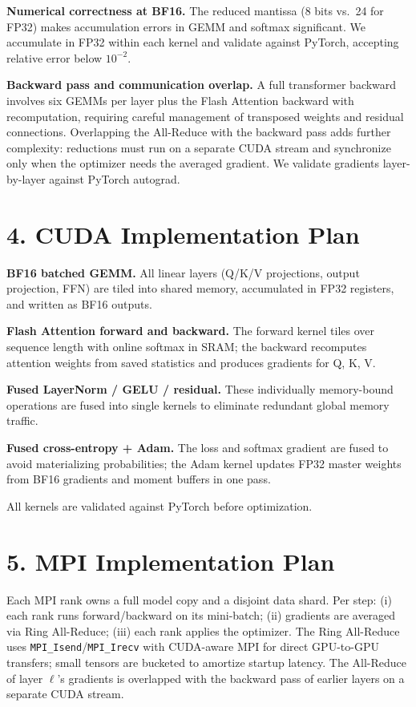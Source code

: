 \documentclass[11pt]{article}
\begin{document}
\textbf{Numerical correctness at BF16.} The reduced mantissa (8 bits vs.\ 24 for FP32) makes accumulation errors in GEMM and softmax significant. We accumulate in FP32 within each kernel and validate against PyTorch, accepting relative error below $10^{-2}$.

\textbf{Backward pass and communication overlap.} A full transformer backward involves six GEMMs per layer plus the Flash Attention backward with recomputation, requiring careful management of transposed weights and residual connections. Overlapping the All-Reduce with the backward pass adds further complexity: reductions must run on a separate CUDA stream and synchronize only when the optimizer needs the averaged gradient. We validate gradients layer-by-layer against PyTorch autograd.

\section*{4. CUDA Implementation Plan}

\textbf{BF16 batched GEMM.} All linear layers (Q/K/V projections, output projection, FFN) are tiled into shared memory, accumulated in FP32 registers, and written as BF16 outputs.

\textbf{Flash Attention forward and backward.} The forward kernel tiles over sequence length with online softmax in SRAM; the backward recomputes attention weights from saved statistics and produces gradients for Q, K, V.

\textbf{Fused LayerNorm / GELU / residual.} These individually memory-bound operations are fused into single kernels to eliminate redundant global memory traffic.

\textbf{Fused cross-entropy + Adam.} The loss and softmax gradient are fused to avoid materializing probabilities; the Adam kernel updates FP32 master weights from BF16 gradients and moment buffers in one pass.

All kernels are validated against PyTorch before optimization.

\section*{5. MPI Implementation Plan}

Each MPI rank owns a full model copy and a disjoint data shard. Per step: (i) each rank runs forward/backward on its mini-batch; (ii) gradients are averaged via Ring All-Reduce; (iii) each rank applies the optimizer. The Ring All-Reduce uses \texttt{MPI\_Isend}/\texttt{MPI\_Irecv} with CUDA-aware MPI for direct GPU-to-GPU transfers; small tensors are bucketed to amortize startup latency. The All-Reduce of layer $\ell$'s gradients is overlapped with the backward pass of earlier layers on a separate CUDA stream.
\end{document}
